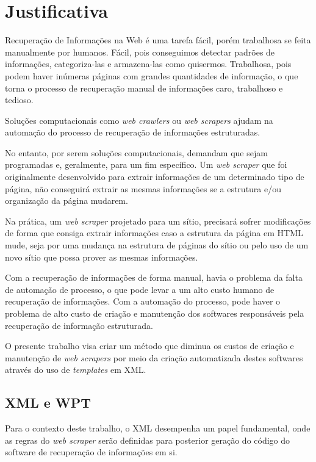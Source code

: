 \chapter{Justificativa}

Recuperação de Informações na Web é uma tarefa fácil, porém trabalhosa se feita manualmente por humanos. Fácil, pois conseguimos detectar padrões de informações, categoriza-las e armazena-las como quisermos. Trabalhosa, pois podem haver inúmeras páginas com grandes quantidades de informação, o que torna o processo de recuperação manual de informações caro, trabalhoso e tedioso.

Soluções computacionais como \emph{web crawlers} ou \emph{web scrapers} ajudam na automação do processo de recuperação de informações estruturadas. 

No entanto, por serem soluções computacionais, demandam que sejam programadas e, geralmente, para um fim específico. Um \emph{web scraper} que foi originalmente desenvolvido para extrair informações de um determinado tipo de página, não conseguirá extrair as mesmas informações se a estrutura e/ou organização da página mudarem.

Na prática, um \emph{web scraper} projetado para um sítio, precisará sofrer modificações de forma que consiga extrair informações caso a estrutura da página em HTML mude, seja por uma mudança na estrutura de páginas do sítio ou pelo uso de um novo sítio que possa prover as mesmas informações.

Com a recuperação de informações de forma manual, havia o problema da falta de automação de processo, o que pode levar a um alto custo humano de recuperação de informações. Com a automação do processo, pode haver o problema de alto custo de criação e manutenção dos softwares responsáveis pela recuperação de informação estruturada.

O presente trabalho visa criar um método que diminua os custos de criação e manutenção de \emph{web scrapers} por meio da criação automatizada destes softwares através do uso de \emph{templates} em XML.

\section{XML e WPT}

Para o contexto deste trabalho, o XML desempenha um papel fundamental, onde as regras do \emph{web scraper} serão definidas para posterior geração do código do software de recuperação de informações em si.

